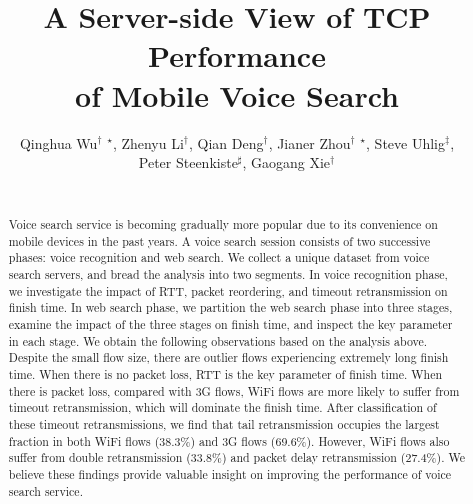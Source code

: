 \documentclass{sig-alternate}
\begin{document}
\title{A Server-side View of TCP Performance \\of Mobile Voice Search}

\author{
	\alignauthor Qinghua Wu$^\dag$ $^\star$, Zhenyu Li$^\dag$, Qian Deng$^\dag$, Jianer Zhou$^\dag$ $^\star$, Steve Uhlig$^\ddag$, \\ Peter Steenkiste$^\sharp$, Gaogang Xie$^\dag$ \\
    \\
}

\maketitle

\begin{abstract}
Voice search service is becoming gradually more popular due to its convenience on mobile devices in the past years. A voice search session consists of two successive phases: voice recognition and web search. We collect a unique dataset from voice search servers, and bread the analysis into two segments. In voice recognition phase, we investigate the impact of RTT, packet reordering, and timeout retransmission on finish time. In web search phase, we partition the web search phase into three stages, examine the impact of the three stages on finish time, and inspect the key parameter in each stage. We obtain the following observations based on the analysis above. Despite the small flow size, there are outlier flows experiencing extremely long finish time. When there is no packet loss, RTT is the key parameter of finish time. When there is packet loss, compared with 3G flows, WiFi flows are more likely to suffer from timeout retransmission, which will dominate the finish time. After classification of these timeout retransmissions, we find that tail retransmission occupies the largest fraction in both WiFi flows (38.3\%) and 3G flows (69.6\%). However, WiFi flows also suffer from double retransmission (33.8\%) and packet delay retransmission (27.4\%). We believe these findings provide valuable insight on improving the performance of voice search service.
\end{abstract}











\end{document}
